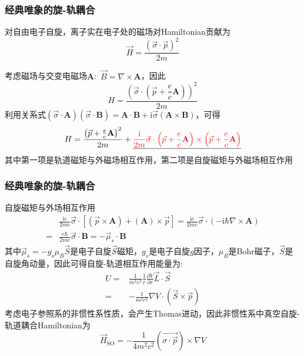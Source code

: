 \documentclass[cjk,slidestop,compress,mathserif,blue]{beamer}
\begin{document}
\frame
{
	\frametitle{经典唯象的旋-轨耦合}
对自由电子自旋，离子实在电子处的磁场对\textrm{Hamiltonian}贡献为
\begin{displaymath}
	\vec H=\frac{(\vec{\sigma}\cdot\vec p)^2}{2m}
\end{displaymath}

考虑磁场与交变电磁场$\mathbf{A}$:~$\vec B=\nabla\times\mathbf A$，因此
\begin{displaymath}
	H=\frac{\left( \vec{\sigma}\cdot\left( \vec p+\dfrac ec\mathbf A \right) \right)^2}{2m}
\end{displaymath}
利用关系式$(\vec{\sigma}\cdot\mathbf A)(\vec{\sigma}\cdot\mathbf B)=\mathbf{A}\cdot\mathbf{B}+\mathrm{i}\vec{\sigma}(\mathbf{A}\times\mathbf{B})$，可得
\begin{displaymath}
	H=\frac{\left( \vec p+\frac ec\mathbf{A} \right)^2}{2m}+\underline{\textcolor{red}{\frac{\mathrm i}{2m}\vec{\sigma}\cdot\left( \vec p+\frac ec\mathbf{A} \right)\times\left( \vec p+\frac ec\mathbf{A} \right)}}
\end{displaymath}
其中第一项是轨道磁矩与外磁场相互作用，第二项是自旋磁矩与外磁场相互作用
}

\frame
{
	\frametitle{经典唯象的旋-轨耦合}
	自旋磁矩与外场相互作用
	\begin{displaymath}
		\begin{aligned}
			&\frac{\mathrm{i}e}{2mc}\vec{\sigma}\cdot[(\vec p\times\mathbf{A})+(\mathbf{A})\times\vec p]=\frac{\mathrm{i}e}{2mc}\vec{\sigma}\cdot(-\mathrm{i}\hbar\nabla\times\mathbf{A})\\
			=&\frac{e\hbar}{2mc}\vec{\sigma}\cdot\mathbf{B}=-\vec{\mu}_s\cdot\mathbf{B}
		\end{aligned}
	\end{displaymath}
	其中$\vec \mu_s=-g_s\mu_B\vec S$是电子自旋$\vec S$磁矩，$g_s$是电子自旋$g$因子，$\mu_B$是\textrm{Bohr}磁子，$\vec S$是自旋角动量，因此可得自旋-轨道相互作用能量为:
	\begin{displaymath}
		\begin{aligned}
			U=&\frac1{m^2c^2}\frac1r\frac{\partial V}{\partial r}\vec L\cdot\vec S\\
			=&-\frac1{m^2c^2}\nabla V\cdot(\vec S\times\vec p)
		\end{aligned}
	\end{displaymath}
	考虑电子参照系的非惯性系性质，会产生\textrm{Thomas}进动，因此非惯性系中真空自旋-轨道耦合\textrm{Hamiltonian}为
	\begin{displaymath}
		\vec H_{\mathrm{SO}}=-\frac1{4m^2c^2}(\vec{\sigma\cdot\vec p})\times\nabla V
	\end{displaymath}
}
\end{document}
